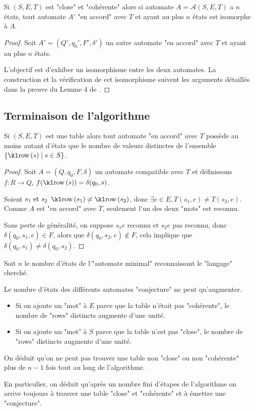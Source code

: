 \begin{lemma}
	Si $(S,E,T)$ est "close" et "cohérente" alors si automate $A = \mathcal A (S,E,T)$
	a $n$ états, tout automate $A'$ "en accord" avec $T$ et ayant au plus $n$ états est isomorphe à $A$.
\end{lemma}

\begin{proof}
	Soit $A' = (Q', q_0', F', \delta')$ un autre automate "en accord" avec $T$ et ayant au plus $n$ états.

	L'objectif est d'exhiber un isomorphisme entre les deux automates. La construction et la vérification
	de cet isomorphisme suivent les arguments détaillés dans la preuve du Lemme 4 de \cite{angluinLearning}.
\end{proof}

\subsection{Terminaison de l'algorithme}

\begin{lemma}
	Si $(S,E,T)$ est une table alors tout automate "en accord" avec $T$ possède au
	moins autant d'états que le nombre de valeurs distinctes de l'ensemble $\setdef {\row s} {s \in S}$.
\end{lemma}

\begin{proof}
	Soit $A = (Q,q_0,F,\delta)$ un automate compatible avec $T$ et définissons
	$f: R \to Q$, $f(\row s) = \delta(q_0, s)$.

	Soient $s_1 \text{ et } s_2$ \tq $\row {s_1} \neq \row{s_2}$, donc $\exists e \in E, T(s_1,e) \neq T(s_2,e)$.
	Comme $A$ est "en accord" avec $T$, seulement l'un des deux "mots" est reconnu.

	Sans perte de généralité, on suppose $s_1e$ reconnu et $s_2e$ pas reconnu, donc
	$\delta (q_0, s_1, e) \in F$, alors que $\delta (q_0,s_2,e) \notin F$, cela implique que
	$\delta (q_0,s_1) \neq \delta (q_0,s_2)$.

\end{proof}

Soit $n$ le nombre d'états de l'"automate minimal" reconnaissant le "langage" cherché.

\begin{remarque}
	Le nombre d'états des différents automates "conjecture" ne peut qu'augmenter.
	\begin{itemize}
		\item Si on ajoute un "mot" à $E$ parce que la table n'était pas "cohérente", le nombre de "rows" distincts augmente
		      d'une unité.
		\item Si on ajoute un "mot" à $S$ parce que la table n'est pas "close", le nombre de "rows" distincts augmente d'une unité.
	\end{itemize}
	On déduit qu'on ne peut pas trouver une table non "close" ou non "cohérente" plus de $n-1$ fois tout au long de l'algorithme.

	En particulier, on déduit qu'après un nombre fini d'étapes de l'algorithme on arrive toujours à trouver
	une table "close" et "cohérente" et à émettre une "conjecture".
\end{remarque}


